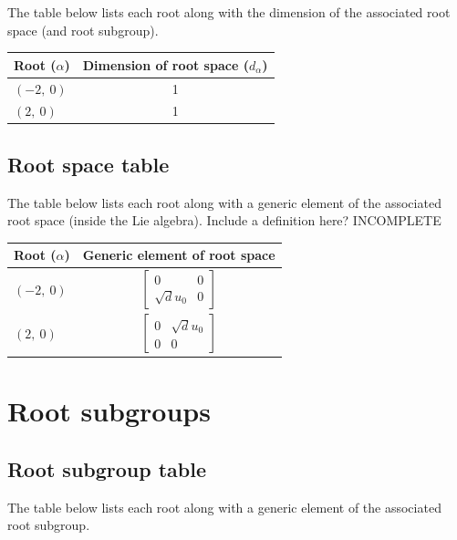 \documentclass[11pt]{article}
\newcommand{\noi}{\noindent}
\theoremstyle{definition}
\begin{document}
The table below lists each root along with the dimension of the associated root space (and root subgroup).

\bigskip

\noindent \begin{tabular}{|l|c|}
    \hline
    \textbf{Root ($\alpha$)} & \textbf{Dimension of root space ($d_{\alpha}$)} \\
    \hline
    $\left( -2, \  0\right)$ & 1 \\
    \hline
    $\left( 2, \  0\right)$ & 1 \\
    \hline
\end{tabular}


\subsection{Root space table}

\noi The table below lists each root along with a generic element of the associated root space (inside the Lie algebra). Include a definition here? INCOMPLETE

\bigskip

\noindent \begin{tabular}{|l|c|}
    \hline
    \textbf{Root ($\alpha$)} & \textbf{Generic element of root space} \\
    \hline
    $\left( -2, \  0\right)$ & $\left[\begin{matrix}0 & 0\\\sqrt{d} u_{0} & 0\end{matrix}\right]$ \\
    \hline
    $\left( 2, \  0\right)$ & $\left[\begin{matrix}0 & \sqrt{d} u_{0}\\0 & 0\end{matrix}\right]$ \\
    \hline
\end{tabular}


\newpage
\section{Root subgroups}

\subsection{Root subgroup table}

\noi The table below lists each root along with a generic element of the associated root subgroup.
\end{document}
